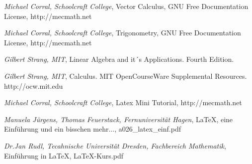 \documentclass[a4paper]{article}
\begin{document}
\begin{thebibliography}    

     \textit{Michael Corral, Schoolcraft College},
	    Vector Calculus, GNU Free Documentation License, http://mecmath.net 
	    
     \textit{Michael Corral, Schoolcraft College},
	    Trigonometry, GNU Free Documentation License, http://mecmath.net         
	    
     \textit{Gilbert Strang, MIT},
	    Linear Algebra and it´s Applications. Fourth Edition.
	    
     \textit{Gilbert Strang, MIT},
            Calculus. MIT OpenCourseWare Supplemental Resources. http://ocw.mit.edu    
            
     \textit{Michael Corral, Schoolcraft College},
            Latex Mini Tutorial, http://mecmath.net            
            
     \textit{Manuela J\"urgens, Thomas Feuerstack, Fernuniversit\"at Hagen},
            LaTeX, eine Einf\"uhrung und ein bisschen mehr..., a026\_latex\_einf.pdf
            
     \textit{Dr.Jan Rudl, Tecahnische Universit\"at Dresden, Fachbereich Mathematik},
            Einf\"uhrung in LaTeX, LaTeX-Kurs.pdf            

\end{thebibliography}
\printindex
\end{document}

